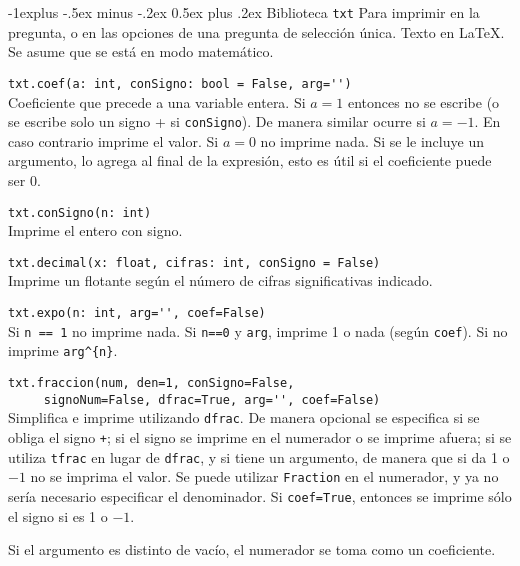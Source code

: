 \documentclass[10pt,landscape]{article}
\makeatletter
\renewcommand{\subsection}{\@startsection{subsection}{2}{0mm}%
                                {-1explus -.5ex minus -.2ex}%
                                {0.5ex plus .2ex}%
                                {\normalfont\normalsize\bfseries}}
\makeatother
\begin{document}
\begin{multicols}{3}
\begin{asparaitem}
\end{asparaitem}

\subsection{Biblioteca \texttt{txt}}
Para imprimir en la pregunta, o en las opciones de una pregunta de selecci\'on \'unica. Texto en \LaTeX. Se asume que se est\'a en modo matem\'atico.
\begin{asparaitem}
\item \verb|txt.coef(a: int, conSigno: bool = False, arg='')| \\
\quad Coeficiente que precede a una variable entera. Si $a=1$ entonces no se escribe (o se escribe solo un signo + si \verb|conSigno|). De manera similar ocurre si $a=-1$. En caso contrario imprime el valor. Si $a=0$ no imprime nada. Si se le incluye un argumento, lo agrega al final de la expresi\'on, esto es \'util si el coeficiente puede ser 0.

\item \verb|txt.conSigno(n: int)| \\
\quad Imprime el entero con signo.

\item \verb|txt.decimal(x: float, cifras: int, conSigno = False)| \\
\quad Imprime un flotante según el n\'umero de cifras significativas indicado.

\item \verb|txt.expo(n: int, arg='', coef=False)| \\
  \quad Si \verb|n == 1| no imprime nada. Si \verb|n==0| y \verb|arg|, imprime 1 o nada (seg\'un \verb|coef|). Si no imprime \verb|arg^{n}|.

\item \verb|txt.fraccion(num, den=1, conSigno=False,|\\
      \verb|     signoNum=False, dfrac=True, arg='', coef=False)| \\
  \quad Simplifica e imprime utilizando \verb|dfrac|. De manera opcional se especifica si se obliga el signo \verb|+|; si el signo se imprime en el numerador o se imprime afuera; si se utiliza \verb|tfrac| en lugar de \verb|dfrac|, y si tiene un argumento, de manera que si da 1 o $-1$ no se imprima el valor. Se puede utilizar \verb|Fraction| en el numerador, y ya no ser\'ia necesario especificar el denominador. Si \verb|coef=True|, entonces se imprime sólo el signo si es 1 o $-1$.

Si el argumento es distinto de vac\'io, el numerador se toma como un coeficiente.


\end{asparaitem}
\end{multicols}
\end{document}
